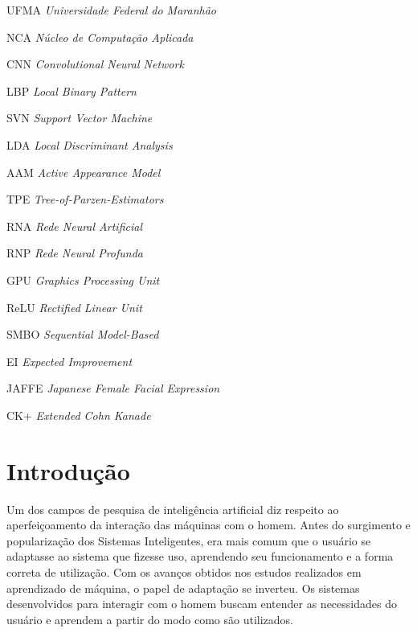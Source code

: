 \documentclass[
12pt,       %
openright,      %
oneside,      %
a4paper,      %
english,      %
french,       %
spanish,      %
brazil        %
]{abntex2}
\begin{document}
\begin{siglas}
\item[UFMA] \textit{Universidade Federal do Maranhão}
\item[NCA] \textit{Núcleo de Computação Aplicada}
\item[CNN] \textit{Convolutional Neural Network}
\item[LBP] \textit{Local Binary Pattern}
\item[SVN] \textit{Support Vector Machine}
\item[LDA] \textit{Local Discriminant Analysis}
\item[AAM] \textit{Active Appearance Model}
\item[TPE] \textit{Tree-of-Parzen-Estimators}
\item[RNA] \textit{Rede Neural Artificial}
\item[RNP] \textit{Rede Neural Profunda}
\item[GPU] \textit{Graphics Processing Unit}
\item[ReLU] \textit{Rectified Linear Unit}
\item[SMBO] \textit{Sequential Model-Based}
\item[EI] \textit{Expected Improvement}
\item[JAFFE] \textit{Japanese Female Facial Expression}
\item[CK+] \textit{Extended Cohn Kanade}
\end{siglas}



\tableofcontents*
\cleardoublepage

\textual

\chapter{Introdução} \label{introducao}
Um dos campos de pesquisa de inteligência artificial diz respeito ao aperfeiçoamento da interação das máquinas com o homem. Antes do surgimento e popularização dos Sistemas Inteligentes, era mais comum que o usuário se adaptasse ao sistema que fizesse uso, aprendendo seu funcionamento e a forma  correta de utilização. Com os avanços obtidos nos estudos realizados em aprendizado de máquina, o papel de adaptação se inverteu. Os sistemas desenvolvidos para interagir com o homem buscam entender as necessidades do usuário e aprendem a partir do modo como são utilizados. 
\end{document}

